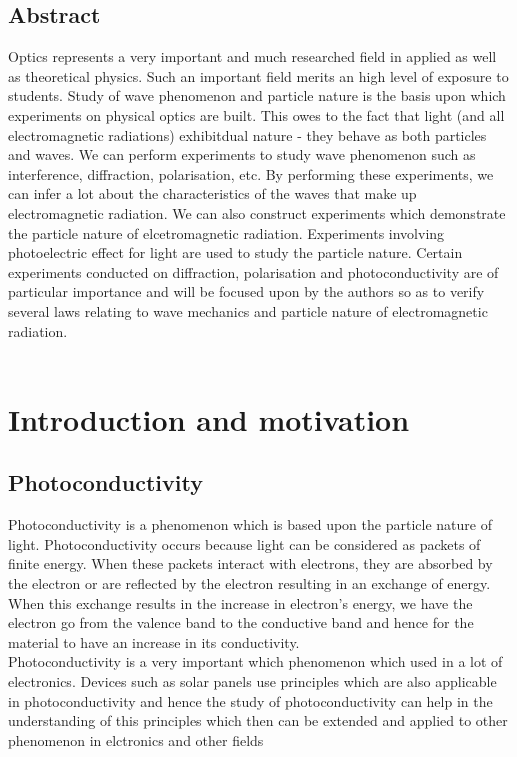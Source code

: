\documentclass[12pt]{report}
\begin{document}
\begin{center}
\section*{Abstract}
\end{center}
Optics represents a very important and much researched field in applied as well as theoretical physics. Such an important field merits an high level of exposure to students. Study of wave phenomenon and particle nature is the basis upon which experiments on physical optics are built. This owes to the fact that light (and all electromagnetic radiations) exhibitdual nature - they behave as both particles and waves. We can perform experiments to study wave phenomenon such as interference, diffraction, polarisation, etc. By performing these experiments, we can infer a lot about the characteristics of the waves that make up electromagnetic radiation. We can also construct experiments which demonstrate the particle nature of elcetromagnetic radiation. Experiments involving photoelectric effect for light are used to study the particle nature. Certain experiments conducted on diffraction, polarisation and photoconductivity are of particular importance and will be focused upon by the authors so as to verify several laws relating to wave mechanics and particle nature of electromagnetic radiation. \\ \\

\newpage
\chapter{Introduction and motivation}
\section{Photoconductivity}
Photoconductivity is a phenomenon which is based upon the particle nature of light. Photoconductivity occurs because light can be considered as packets of finite energy. When these packets interact with electrons, they are absorbed by the electron or are reflected by the electron resulting in an exchange of energy. When this exchange results in the increase in electron's energy, we have the electron go from the valence band to the conductive band and hence for the material to have an increase in its conductivity.\\
Photoconductivity is a very important which phenomenon which used in a lot of electronics. Devices such as solar panels use principles which are also applicable in photoconductivity and hence the study of photoconductivity can help in the understanding of this principles which then can be extended and applied to other phenomenon in elctronics and other fields
\end{document}
